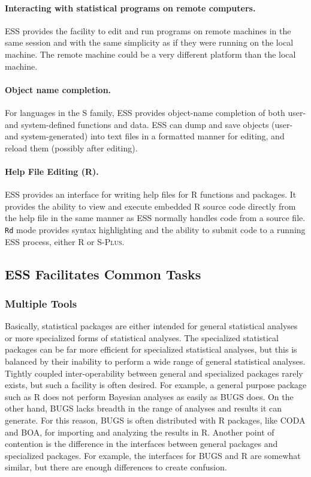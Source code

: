 \documentclass{article}
\newcommand*{\Splus}{\textsc{S-Plus}}
\newcommand{\stexttt}[1]{{\small\texttt{#1}}}
\begin{document}
\paragraph{Interacting with statistical programs on remote computers.}
ESS provides the facility to edit and run programs on remote machines
in the same session and with the same simplicity as if they were
running on the local machine.  The remote machine could be a very
different platform than the local machine.

\paragraph{Object name completion.}
For languages in the S family,
ESS provides object-name completion of both user- and
system-defined functions and data.  ESS can dump and save objects
(user- and system-generated) into text files in a formatted manner for
editing, and reload them (possibly after editing).

\paragraph{Help File Editing (R).}
ESS provides an interface for writing help files for R functions
and packages.  It provides the ability to view and execute embedded R
source code directly from the help file in the same manner as ESS
normally handles code from a source file.  \stexttt{Rd} mode provides
syntax highlighting and the ability to submit code to a running ESS
process, either R or \Splus.


\subsection{ESS Facilitates Common Tasks}
\label{sec:ess-facil-comm}

\subsubsection{Multiple Tools}
\label{sec:multiple-tools}

Basically, statistical packages are either intended for general 
statistical analyses or more specialized forms of statistical analyses.  
The specialized statistical packages can be far more efficient for
specialized statistical analyses, but this is balanced by their inability
to perform a wide range of general statistical analyses.  Tightly coupled 
inter-operability between general and specialized packages rarely exists, 
but such a facility is often desired.  For example, a general purpose 
package such as R does not perform Bayesian analyses as easily as BUGS does.  
On the other hand, BUGS lacks breadth in the range of analyses and results 
it can generate.  For this reason, BUGS is often distributed with R packages, 
like CODA and BOA, for importing and analyzing the results in R.  Another
point of contention is the difference in the interfaces between general
packages and specialized packages.  For example, the interfaces for BUGS 
and R are somewhat similar, but there are enough differences to create confusion.
\end{document}
